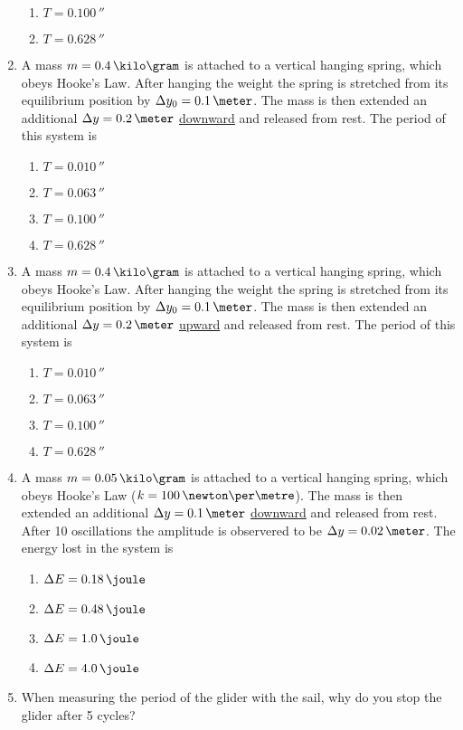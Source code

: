 \begin{enumerate}
\begin{enumerate}
  \item $T = 0.100\,\second$
  \item $T = 0.628\,\second$
  \end{enumerate}
\item A mass $m = 0.4\,\kilo\gram$ is attached to a vertical hanging spring, which obeys Hooke's Law. After hanging the weight the spring is stretched from its equilibrium position by $\Delta y_0 = 0.1\,\meter$. The mass is then extended an additional $\Delta y = 0.2\,\meter$ \underline{downward} and released from rest. The period of this system is
  \begin{enumerate}
  \item $T = 0.010\,\second$
  \item $T = 0.063\,\second$
  \item $T = 0.100\,\second$
  \item $T = 0.628\,\second$
  \end{enumerate}
\item A mass $m = 0.4\,\kilo\gram$ is attached to a vertical hanging spring, which obeys Hooke's Law. After hanging the weight the spring is stretched from its equilibrium position by $\Delta y_0 = 0.1\,\meter$. The mass is then extended an additional $\Delta y = 0.2\,\meter$ \underline{upward} and released from rest. The period of this system is
  \begin{enumerate}
  \item $T = 0.010\,\second$
  \item $T = 0.063\,\second$
  \item $T = 0.100\,\second$
  \item $T = 0.628\,\second$
  \end{enumerate}
\item A mass $m = 0.05\,\kilo\gram$ is attached to a vertical hanging spring, which obeys Hooke's Law ($k = 100\,\newton\per\metre$). The mass is then extended an additional $\Delta y = 0.1\,\meter$ \underline{downward} and released from rest. After 10 oscillations the amplitude is observered to be $\Delta y = 0.02\,\meter$. The energy lost in the system is
  \begin{enumerate}
  \item $\Delta E = 0.18\,\joule$
  \item $\Delta E = 0.48\,\joule$
  \item $\Delta E = 1.0\,\joule$
  \item $\Delta E = 4.0\,\joule$
  \end{enumerate}
\item When measuring the period of the glider with the sail, why do you stop the glider after 5 cycles?

\end{enumerate}
